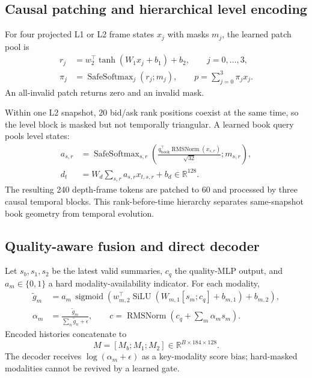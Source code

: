 \documentclass[10pt,letterpaper]{article}
\numberwithin{equation}{section}
\newcommand{\R}{\mathbb{R}}
\newcommand{\sigmoid}{\operatorname{sigmoid}}
\newcommand{\RMSNorm}{\operatorname{RMSNorm}}
\newcommand{\SafeSoftmax}{\operatorname{SafeSoftmax}}
\theoremstyle{definition}
\theoremstyle{remark}
\begin{document}
\subsection{Causal patching and hierarchical level encoding}

For four projected L1 or L2 frame states \(x_j\) with masks \(m_j\), the
learned patch pool is
\begin{align}
r_j&=w_2^\top\tanh(W_1x_j+b_1)+b_2,\qquad j=0,\ldots,3,\nonumber\\
\pi_j&=\SafeSoftmax_j(r_j;m_j),\qquad
p=\sum_{j=0}^{3}\pi_jx_j.
\label{eq:patch-pool}
\end{align}
An all-invalid patch returns zero and an invalid mask.

Within one L2 snapshot, 20 bid/ask rank positions coexist at the same time, so
the level block is masked but not temporally triangular. A learned book query
pools level states:
\begin{align}
a_{s,r}
&=\SafeSoftmax_{s,r}\!\left(
\frac{q_{\mathrm{book}}^\top\RMSNorm(x_{s,r})}{\sqrt{32}};m_{s,r}
\right),\nonumber\\
d_t&=W_d\sum_{s,r}a_{s,r}x_{t,s,r}+b_d\in\R^{128}.
\label{eq:book-pool}
\end{align}
The resulting 240 depth-frame tokens are patched to 60 and processed by three
causal temporal blocks. This rank-before-time hierarchy separates same-snapshot
book geometry from temporal evolution.

\subsection{Quality-aware fusion and direct decoder}

Let \(s_b,s_1,s_2\) be the latest valid summaries, \(c_q\) the quality-MLP
output, and \(a_m\in\{0,1\}\) a hard modality-availability indicator. For each
modality,
\begin{align}
\widetilde g_m&=a_m\,\sigmoid\!\left(
w_{m,2}^{\top}\operatorname{SiLU}
(W_{m,1}[s_m;c_q]+b_{m,1})+b_{m,2}\right),\nonumber\\
\alpha_m&=\frac{\widetilde g_m}{\sum_n\widetilde g_n+\epsilon},\qquad
c=\RMSNorm\!\left(c_q+\sum_m\alpha_ms_m\right).
\label{eq:fusion-gates}
\end{align}
Encoded histories concatenate to
\begin{equation}
M=[M_b;M_1;M_2]\in\R^{B\times184\times128}.
\label{eq:fused-memory}
\end{equation}
The decoder receives \(\log(\alpha_m+\epsilon)\) as a key-modality score bias;
hard-masked modalities cannot be revived by a learned gate.
\end{document}

